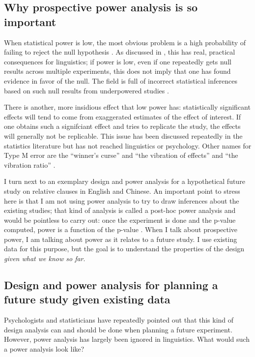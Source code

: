 \documentclass{ar-1col}\usepackage[]{graphicx}\usepackage[]{color}
\begin{document}
\subsection{Why prospective power analysis is so important}

When statistical power is low, the most obvious problem is a high probability of failing to reject the null hypothesis \citep{hoenigheisey}. As discussed in \citet{VasishthGelman2021}, this has real, practical consequences for linguistics; if power is low, even if one repeatedly gets null results across multiple experiments, this does not imply that one has found evidence in favor of the null. The field is full of incorrect statistical inferences based on such null results from underpowered studies \citep[e.g.,][]{PankratzEtAl2021,logacev2021statistical}.

There is another, more insidious effect that low power has: statistically significant effects will tend to come from exaggerated estimates of the effect of interest. If one obtains such a signifciant effect and tries to replicate the study, the effects will generally not be replicable. This issue has been discussed repeatedly in the statistics literature \citep{lane1978estimating,hedges1984estimation} but has not reached linguistics or psychology. Other names for Type M error are the ``winner's curse'' and ``the vibration of effects'' \citep{powerfailure} and ``the vibration ratio'' \citep{ioannidis2008most}.




I turn next to an exemplary design and power analysis for a hypothetical future study on relative clauses in English and Chinese. An important point to stress here is that I am not using power analysis to try to draw inferences about the existing studies; that kind of analysis is called a post-hoc power analysis and would be pointless to carry out: once the experiment is done and the p-value computed, power is a function of the p-value \citep{hoenigheisey}. When I talk about prospective power, I am talking about power as it relates to a future study. I use existing data for this purpose, but the goal is to understand the properties of the design \textit{given what we know so far}.  

\subsection{Design and power analysis for planning a future study given existing data}

 Psychologists and statisticians have repeatedly pointed out \citep{cohen1962statistical,powerbookcohen,gelmancarlin,moerbeek2015power} that this kind of design analysis can and should be done when planning a future experiment. However, power analysis has largely been ignored in linguistics. What would such a power analysis look like?
\end{document}

